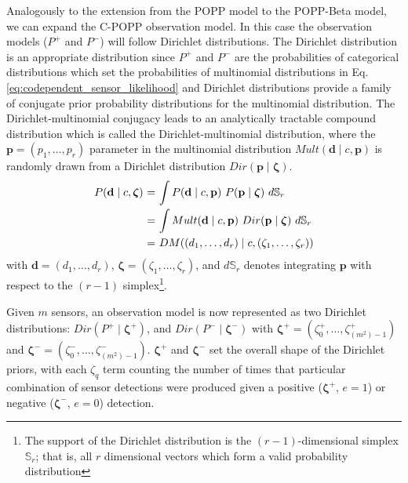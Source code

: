 Analogously to the extension from the POPP model to the POPP-Beta model, we can expand the C-POPP observation model. In this case the observation models ($P^+$ and $P^-$) will follow Dirichlet distributions. The Dirichlet distribution is an appropriate distribution since $P^+$ and $P^-$ are the probabilities of categorical distributions which set the probabilities of multinomial distributions in Eq. \ref{eq:codependent_sensor_likelihood} and Dirichlet distributions provide a family of conjugate prior probability distributions for the multinomial distribution. The Dirichlet-multinomial conjugacy leads to an analytically tractable compound distribution which is called the Dirichlet-multinomial distribution, where the $\mathbf{p} = (p_1, \ldots, p_r)$ parameter in the multinomial distribution $Mult(\mathbf{d} \mid c, \mathbf{p})$ is randomly drawn from a Dirichlet distribution $Dir(\mathbf{p} \mid \boldsymbol{\zeta})$. 
\begin{equation}
	\label{eq:beta_binomial_revisit}
	\begin{tabular}{r@{ = }l}
        $P(\mathbf{d} \mid c, \boldsymbol{\zeta})$ & $\displaystyle\int P(\mathbf{d} \mid c, \mathbf{p}) ~ P(\mathbf{p} \mid \boldsymbol{\zeta}) ~d\mathbb S_r$ \\ [2ex]
        & $\displaystyle\int Mult(\mathbf{d} \mid c, \mathbf{p}) ~ Dir(\mathbf{p} \mid \boldsymbol{\zeta}) ~d\mathbb S_r$ \\ [2ex]
        & $DM((d_1, \ldots, d_r) \mid c, (\zeta_1, \ldots, \zeta_r))$
	\end{tabular}
\end{equation}
\noindent with $\mathbf{d} = (d_1, \ldots, d_r)$, $\boldsymbol{\zeta} = (\zeta_1, \ldots, \zeta_r)$, and $d\mathbb S_r$ denotes integrating $\mathbf{p}$ with respect to the $(r - 1)$ simplex\footnote{The support of the Dirichlet distribution is the $(r - 1)$-dimensional simplex $\mathbb S_r$; that is, all $r$ dimensional vectors which form a valid probability distribution}.

Given $m$ sensors, an observation model is now represented as two Dirichlet distributions: $Dir(P^+ \mid \boldsymbol{\zeta^+})$, and $Dir(P^- \mid \boldsymbol{\zeta^-})$ with $\boldsymbol{\zeta^+} = (\zeta^+_0, \ldots, \zeta^+_{(m^2)-1})$ and $\boldsymbol{\zeta^-} = (\zeta^-_0, \ldots, \zeta^-_{(m^2)-1})$. $\boldsymbol{\zeta^+}$ and $\boldsymbol{\zeta^-}$ set the overall shape of the Dirichlet priors, with each $\zeta_q$ term counting the number of times that particular combination of sensor detections were produced given a positive ($\boldsymbol{\zeta^+}$, $e=1$) or negative ($\boldsymbol{\zeta^-}$, $e=0$) detection.

